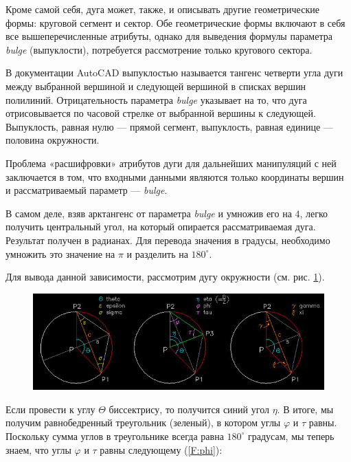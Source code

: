 Кроме самой себя, дуга может, также, и описывать другие геометрические формы: круговой сегмент и сектор. Обе геометрические формы включают в себя все вышеперечисленные атрибуты, однако для выведения формулы параметра \textit{bulge} (выпуклости), потребуется рассмотрение только кругового сектора.

В документации AutoCAD \cite{autocad2012dxf} выпуклостью называется тангенс четверти угла дуги между выбранной вершиной и следующей вершиной в списках вершин полилиний. Отрицательность параметра \textit{bulge} указывает на то, что дуга отрисовывается по часовой стрелке от выбранной вершины к следующей. Выпуклость, равная нулю --- прямой сегмент, выпуклость, равная единице --- половина окружности.

Проблема «расшифровки» атрибутов дуги для дальнейших манипуляций с ней заключается в том, что входными данными являются только координаты вершин и рассматриваемый параметр --- \textit{bulge}.

В самом деле, взяв арктангенс от параметра \textit{bulge} и умножив его на $4$, легко получить центральный угол, на который опирается рассматриваемая дуга. Результат получен в радианах. Для перевода значения в градусы, необходимо умножить это значение на $\pi$ и разделить на $180^{\circ}$.

Для вывода данной зависимости, рассмотрим дугу окружности (см. рис. \ref{fig:arcchord}).

\begin{figure}[H]
	\centering
	\includegraphics[width=1.0\textwidth]{figures/arcchord.png}
	\label{fig:arcchord}
\end{figure}

Если провести к углу $\Theta$ биссектрису, то получится синий угол $\eta$. В итоге, мы получим равнобедренный треугольник (зеленый), в котором углы $\varphi$ и $\tau$ равны. Поскольку сумма углов в треугольнике всегда равна $180^{\circ}$ градусам, мы теперь знаем, что углы $\varphi$ и $\tau$ равны следующему (\ref{F:phi}):

